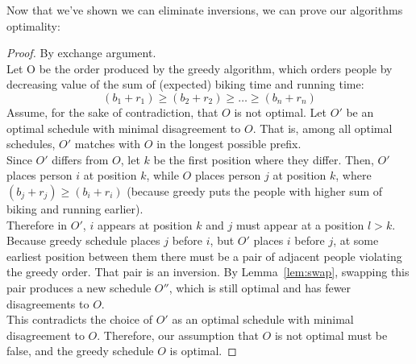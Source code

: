 \documentclass[a4paper,11pt]{article}
\begin{document}
Now that we've shown we can eliminate inversions, we can prove our algorithms optimality:

\begin{proof}
    By exchange argument.\\
    Let O be the order produced by the greedy algorithm, which orders people by decreasing value of the sum of (expected) biking time and running time:
    \[
    (b_1 + r_1) \ge (b_2 + r_2) \ge \dots \ge (b_n + r_n)
    \]
    Assume, for the sake of contradiction, that $O$ is not optimal. Let $O'$ be an optimal schedule with minimal disagreement to $O$. That is, among all optimal schedules, $O'$ matches with $O$ in the longest possible prefix.\\
    Since $O'$ differs from $O$, let $k$ be the first position where they differ. Then, $O'$ places person $i$ at position $k$, while $O$ places person $j$ at position $k$, where $(b_j + r_j) \ge (b_i + r_i)$ (because greedy puts the people with higher sum of biking and running earlier).\\
    Therefore in $O'$, $i$ appears at position $k$ and $j$ must appear at a position $l > k$.\\
    Because greedy schedule places $j$ before $i$, but $O'$ places $i$ before $j$, at some earliest position between them there must be a pair of adjacent people violating the greedy order. That pair is an inversion.
    By Lemma~\ref{lem:swap}, swapping this pair produces a new schedule $O''$, which is still optimal and has fewer disagreements to $O$.\\
    This contradicts the choice of $O'$ as an optimal schedule with minimal disagreement to $O$. Therefore, our assumption that $O$ is not optimal must be false, and the greedy schedule $O$ is optimal.
\end{proof}
\end{document}
